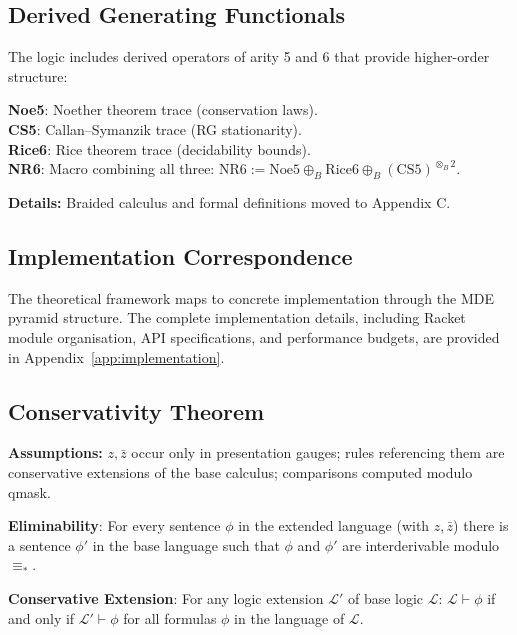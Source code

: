 \subsection{Derived Generating Functionals}

The logic includes derived operators of arity 5 and 6 that provide higher-order structure:

\begin{definition}
\label{def:derived-functionals}
\textbf{Noe5}: Noether theorem trace \cite{noether1918} (conservation laws). \\
\textbf{CS5}: Callan–Symanzik trace (RG stationarity). \\
\textbf{Rice6}: Rice theorem trace \cite{rice1953} (decidability bounds). \\
\textbf{NR6}: Macro combining all three: $\text{NR6} := \text{Noe5} \oplus_B \text{Rice6} \oplus_B (\text{CS5})^{\otimes_B 2}$.
\end{definition}

\textbf{Details:} Braided calculus and formal definitions moved to Appendix C.

\subsection{Implementation Correspondence}

The theoretical framework maps to concrete implementation through the MDE pyramid structure. The complete implementation details, including Racket module organisation, API specifications, and performance budgets, are provided in Appendix~\ref{app:implementation}.

\subsection{Conservativity Theorem}

\begin{notation}[Hypotheses]
\label{not:hypotheses}
\textbf{Assumptions:} $z,\bar z$ occur only in presentation gauges; rules referencing them are conservative extensions of the base calculus; comparisons computed modulo qmask.
\end{notation}

\begin{theorem}
\label{thm:conservativity}
\textbf{Eliminability}: For every sentence $\phi$ in the extended language (with $z, \bar{z}$) there is a sentence $\phi'$ in the base language such that $\phi$ and $\phi'$ are interderivable modulo $\equiv_*$.

\textbf{Conservative Extension}: For any logic extension $\mathcal{L}'$ of base logic $\mathcal{L}$: $\mathcal{L} \vdash \phi$ if and only if $\mathcal{L}' \vdash \phi$ for all formulas $\phi$ in the language of $\mathcal{L}$.
\end{theorem}

